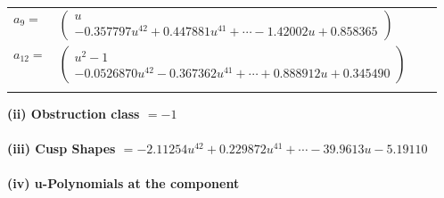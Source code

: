 \documentclass[1p]{elsarticle_modified}
\theoremstyle{definition}
\begin{document}
\begin{tabular}{m{7pt} m{180pt} m{7pt} m{180pt} }
\flushright $a_{9}=$&$\begin{pmatrix}u\\-0.357797 u^{42}+0.447881 u^{41}+\cdots-1.42002 u+0.858365\end{pmatrix}$ \\
\flushright $a_{12}=$&$\begin{pmatrix}u^2-1\\-0.0526870 u^{42}-0.367362 u^{41}+\cdots+0.888912 u+0.345490\end{pmatrix}$\\&\end{tabular}
\flushleft \textbf{(ii) Obstruction class $= -1$}\\~\\
\flushleft \textbf{(iii) Cusp Shapes $= -2.11254 u^{42}+0.229872 u^{41}+\cdots-39.9613 u-5.19110$}\\~\\
\newpage\renewcommand{\arraystretch}{1}
\flushleft \textbf{(iv) u-Polynomials at the component}\newline \\
\end{document}
